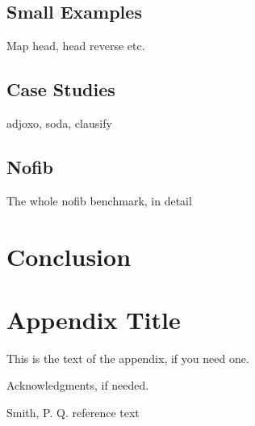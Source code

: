 \documentclass[preprint]{sigplanconf}
\begin{document}
\subsection{Small Examples}

Map head, head reverse etc.


\subsection{Case Studies}

adjoxo, soda, clausify

\subsection{Nofib}

The whole nofib benchmark, in detail

\section{Conclusion}
\label{chap:conc}






\appendix
\section{Appendix Title}

This is the text of the appendix, if you need one.

\acks

Acknowledgments, if needed.

\begin{thebibliography}{}

Smith, P. Q. reference text

\end{thebibliography}
\end{document}

